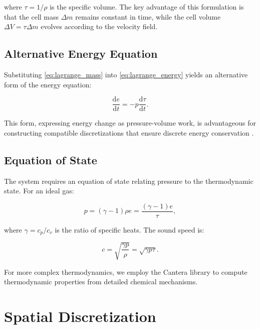 \documentclass[12pt,a4paper]{article}
\newcommand{\dd}{\mathrm{d}}
\begin{document}
\noindent where $\tau = 1/\rho$ is the specific volume. The key advantage of this formulation is that the cell mass $\Delta m$ remains constant in time, while the cell volume $\Delta V = \tau \Delta m$ evolves according to the velocity field.

\subsection{Alternative Energy Equation}

Substituting \eqref{eq:lagrange_mass} into \eqref{eq:lagrange_energy} yields an alternative form of the energy equation:

\begin{equation}
    \frac{\dd e}{\dd t} = -p \frac{\dd \tau}{\dd t}.
    \label{eq:energy_alternative}
\end{equation}

This form, expressing energy change as pressure-volume work, is advantageous for constructing compatible discretizations that ensure discrete energy conservation \citep{Caramana1998}.

\subsection{Equation of State}

The system requires an equation of state relating pressure to the thermodynamic state. For an ideal gas:

\begin{equation}
    p = (\gamma - 1) \rho e = \frac{(\gamma - 1) e}{\tau},
    \label{eq:eos_ideal}
\end{equation}

\noindent where $\gamma = c_p/c_v$ is the ratio of specific heats. The sound speed is:

\begin{equation}
    c = \sqrt{\frac{\gamma p}{\rho}} = \sqrt{\gamma p \tau}.
    \label{eq:sound_speed}
\end{equation}

For more complex thermodynamics, we employ the Cantera library \citep{Cantera} to compute thermodynamic properties from detailed chemical mechanisms.

\section{Spatial Discretization}
\label{sec:discretization}
\end{document}
